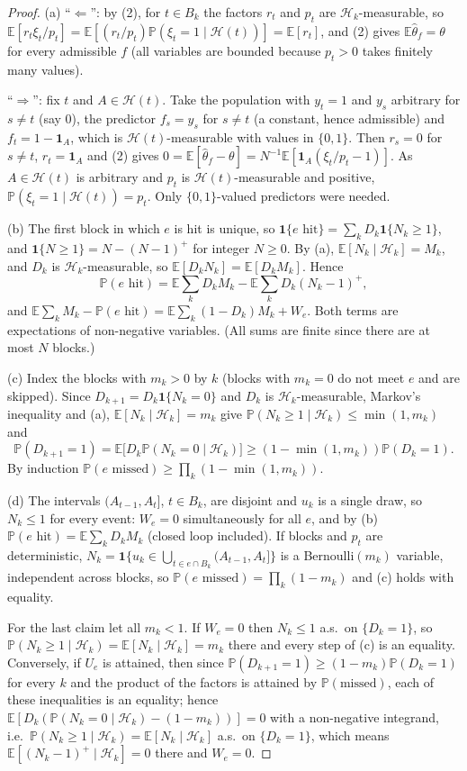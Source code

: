 \documentclass[11pt]{article}
\theoremstyle{remark}
\newcommand{\E}{\mathbb{E}}
\renewcommand{\Pr}{\mathbb{P}}
\newcommand{\one}{\mathbf 1}
\newcommand{\Hk}{\mathcal H}
\newcommand{\hth}{\hat\theta}
\begin{document}
\begin{proof}
(a) ``$\Leftarrow$'': by (2), for $t\in B_k$ the factors $r_t$ and $p_t$ are $\Hk_k$-measurable, so $\E[r_t\xi_t/p_t]=\E[(r_t/p_t)\Pr(\xi_t=1\mid\Hk(t))]=\E[r_t]$, and (2) gives $\E\hth_f=\theta$ for every admissible $f$ (all variables are bounded because $p_t>0$ takes finitely many values).

``$\Rightarrow$'': fix $t$ and $A\in\Hk(t)$. Take the population with $y_t=1$ and $y_s$ arbitrary for $s\ne t$ (say $0$), the predictor $f_s=y_s$ for $s\ne t$ (a constant, hence admissible) and $f_t=1-\one_A$, which is $\Hk(t)$-measurable with values in $\{0,1\}$. Then $r_s=0$ for $s\ne t$, $r_t=\one_A$ and (2) gives $0=\E[\hth_f-\theta]=N^{-1}\E[\one_A(\xi_t/p_t-1)]$. As $A\in\Hk(t)$ is arbitrary and $p_t$ is $\Hk(t)$-measurable and positive, $\Pr(\xi_t=1\mid\Hk(t))=p_t$. Only $\{0,1\}$-valued predictors were needed.

(b) The first block in which $e$ is hit is unique, so $\one\{e\text{ hit}\}=\sum_kD_k\one\{N_k\ge1\}$, and $\one\{N\ge1\}=N-(N-1)^+$ for integer $N\ge0$. By (a), $\E[N_k\mid\Hk_k]=M_k$, and $D_k$ is $\Hk_k$-measurable, so $\E[D_kN_k]=\E[D_kM_k]$. Hence
\[
\Pr(e\text{ hit})=\E\sum_kD_kM_k-\E\sum_kD_k(N_k-1)^+ ,
\]
and $\E\sum_kM_k-\Pr(e\text{ hit})=\E\sum_k(1-D_k)M_k+W_e$. Both terms are expectations of non-negative variables. (All sums are finite since there are at most $N$ blocks.)

(c) Index the blocks with $m_k>0$ by $k$ (blocks with $m_k=0$ do not meet $e$ and are skipped). Since $D_{k+1}=D_k\one\{N_k=0\}$ and $D_k$ is $\Hk_k$-measurable, Markov's inequality and (a), $\E[N_k\mid\Hk_k]=m_k$ give $\Pr(N_k\ge1\mid\Hk_k)\le\min(1,m_k)$ and
\[
\Pr(D_{k+1}=1)=\E\big[D_k\Pr(N_k=0\mid\Hk_k)\big]\ge(1-\min(1,m_k))\Pr(D_k=1).
\]
By induction $\Pr(e\text{ missed})\ge\prod_k(1-\min(1,m_k))$.

(d) The intervals $(A_{t-1},A_t]$, $t\in B_k$, are disjoint and $u_k$ is a single draw, so $N_k\le1$ for every event: $W_e=0$ simultaneously for all $e$, and by (b) $\Pr(e\text{ hit})=\E\sum_kD_kM_k$ (closed loop included). If blocks and $p_t$ are deterministic, $N_k=\one\{u_k\in\bigcup_{t\in e\cap B_k}(A_{t-1},A_t]\}$ is a Bernoulli$(m_k)$ variable, independent across blocks, so $\Pr(e\text{ missed})=\prod_k(1-m_k)$ and (c) holds with equality.

For the last claim let all $m_k<1$. If $W_e=0$ then $N_k\le1$ a.s.\ on $\{D_k=1\}$, so $\Pr(N_k\ge1\mid\Hk_k)=\E[N_k\mid\Hk_k]=m_k$ there and every step of (c) is an equality. Conversely, if $U_e$ is attained, then since $\Pr(D_{k+1}=1)\ge(1-m_k)\Pr(D_k=1)$ for every $k$ and the product of the factors is attained by $\Pr(\text{missed})$, each of these inequalities is an equality; hence $\E[D_k(\Pr(N_k=0\mid\Hk_k)-(1-m_k))]=0$ with a non-negative integrand, i.e.\ $\Pr(N_k\ge1\mid\Hk_k)=\E[N_k\mid\Hk_k]$ a.s.\ on $\{D_k=1\}$, which means $\E[(N_k-1)^+\mid\Hk_k]=0$ there and $W_e=0$.
\end{proof}
\end{document}
